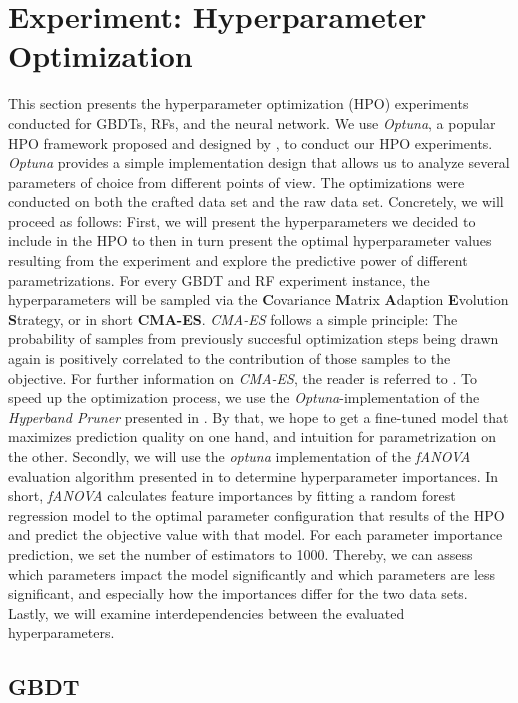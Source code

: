 \section{Experiment: Hyperparameter Optimization}\label{sec:hpo}
This section presents the hyperparameter optimization (HPO) experiments conducted for GBDTs, RFs, and the neural network. 
We use \textit{Optuna}, a popular HPO framework proposed and designed by \cite{akiba2019optuna}, to conduct our HPO experiments. 
\textit{Optuna} provides a simple implementation design that allows us to analyze several parameters of choice from different points of view. 
The optimizations were conducted on both the crafted data set and the raw data set. 
Concretely, we will proceed as follows: First, we will present the hyperparameters we decided to include in the HPO to then in turn present the optimal hyperparameter values resulting from the experiment and explore the predictive power of different parametrizations. 
For every GBDT and RF experiment instance, the hyperparameters will be sampled via the \textbf{C}ovariance \textbf{M}atrix \textbf{A}daption \textbf{E}volution \textbf{S}trategy, or in short \textbf{CMA-ES}. 
\textit{CMA-ES} follows a simple principle: The probability of samples from previously succesful optimization steps being drawn again is positively correlated to the contribution of those samples to the objective. For further information on \textit{CMA-ES}, the reader is referred to \cite{hansen2016cma}. 
To speed up the optimization process, we use the \textit{Optuna}-implementation of the \textit{Hyperband Pruner} presented in \cite{li2018hyperband}. 
By that, we hope to get a fine-tuned model that maximizes prediction quality on one hand, and intuition for parametrization on the other.
Secondly, we will use the \textit{optuna} implementation of the \textit{fANOVA} evaluation algorithm presented in \cite{fANOVA} to determine hyperparameter importances. 
In short, \textit{fANOVA} calculates feature importances by fitting a random forest regression model to the optimal parameter configuration that results of the HPO and predict the objective value with that model. For each parameter importance prediction, we set the number of estimators to 1000.
Thereby, we can assess which parameters impact the model significantly and which parameters are less significant, and especially how the importances differ for the two data sets. 
Lastly, we will examine interdependencies between the evaluated hyperparameters. 
 
\subsection{GBDT}

